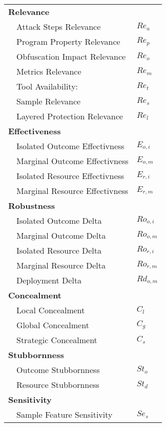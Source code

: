 \begin{table}[t]
    \centering
    \begin{tabular}{c p{6cm} l}
\hline
    \multicolumn{3}{l}{\textbf{Relevance}}\\
       & Attack Steps Relevance  & $Re_{a}$ \\
       & Program Property Relevance & $Re_{p}$ \\
       & Obfuscation Impact Relevance & $Re_{o}$ \\
       & Metrics Relevance & $Re_{m}$ \\
       & Tool Availability:& $Re_{t}$ \\
       & Sample Relevance & $Re_{s}$\\
       & Layered Protection Relevance & $Re_{l}$\\
    \multicolumn{3}{l}{\textbf{Effectiveness}}\\
   & Isolated Outcome Effectivness & $E_{o,i}$ \\
   & Marginal Outcome Effectivness & $E_{o,m}$ \\   
   & Isolated Resource Effectivness & $E_{r,i}$ \\
   & Marginal Resource Effectivness & $E_{r,m}$ \\
    \multicolumn{3}{l}{\textbf{Robustness}}\\
     &  Isolated Outcome Delta & $Ro_{o,i}$ \\
     &  Marginal Outcome Delta & $Ro_{o,m}$ \\
     &  Isolated Resource Delta & $Ro_{r,i}$ \\
     &  Marginal Resource Delta & $Ro_{r,m}$ \\
     &  Deployment Delta & $Rd_{o,m}$ \\
    \multicolumn{3}{l}{\textbf{Concealment}}\\
         &  Local Concealment & $C_{l}$ \\
         &  Global Concealment & $C_{g}$ \\
         &  Strategic Concealment & $C_{s}$ \\
    \multicolumn{3}{l}{\textbf{Stubbornness}}\\
         &  Outcome Stubbornness & $St_{o}$ \\
         &  Resource Stubbornness & $St_{d}$ \\
   \multicolumn{3}{l}{\textbf{Sensitivity}}\\
         &  Sample Feature Sensitivity & $Se_{s}$ \\

\end{tabular}
\end{table}
